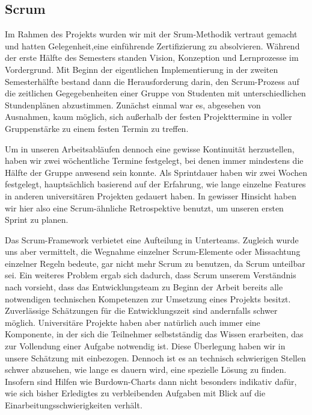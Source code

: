 \subsection{Scrum}
	Im Rahmen des Projekts wurden wir mit der Srum-Methodik vertraut gemacht und hatten Gelegenheit,eine einführende Zertifizierung zu absolvieren. Während der erste Hälfte des Semesters standen Vision, Konzeption und Lernprozesse im Vordergrund. Mit Beginn der eigentlichen Implementierung in der zweiten Semesterhälfte bestand dann die Herausforderung darin, den Scrum-Prozess auf die zeitlichen Gegegebenheiten einer Gruppe von Studenten mit unterschiedlichen Stundenplänen abzustimmen. Zunächst einmal war es, abgesehen von Ausnahmen, kaum möglich, sich außerhalb der festen Projekttermine in voller Gruppenstärke zu einem festen Termin zu treffen. 
    
	Um in unseren Arbeitsabläufen dennoch eine gewisse Kontinuität herzustellen, haben wir zwei wöchentliche Termine festgelegt, bei denen immer mindestens die Hälfte der Gruppe anwesend sein konnte. Als Sprintdauer haben wir zwei Wochen festgelegt, hauptsächlich basierend auf der Erfahrung, wie lange einzelne Features in anderen universitären Projekten gedauert haben. In gewisser Hinsicht haben wir hier also eine Scrum-ähnliche Retrospektive benutzt, um unseren ersten Sprint zu planen.
    
	Das Scrum-Framework verbietet eine Aufteilung in Unterteams. Zugleich wurde uns aber vermittelt, die Wegnahme einzelner Scrum-Elemente oder Missachtung einzelner Regeln bedeute, gar nicht mehr Scrum zu benutzen, da Scrum unteilbar sei. Ein weiteres Problem ergab sich dadurch, dass Scrum unserem Verständnis nach vorsieht, dass das Entwicklungsteam zu Beginn der Arbeit bereits alle notwendigen technischen Kompetenzen zur Umsetzung eines Projekts besitzt. Zuverlässige Schätzungen für die Entwicklungszeit sind andernfalls schwer möglich. Universitäre Projekte haben aber natürlich auch immer eine Komponente, in der sich die Teilnehmer selbstständig das Wissen erarbeiten, das zur Vollendung einer Aufgabe notwendig ist. Diese Überlegung haben wir in unsere Schätzung mit einbezogen. Dennoch ist es an technisch schwierigen Stellen schwer abzusehen, wie lange es dauern wird, eine spezielle Lösung zu finden. Insofern sind Hilfen wie Burdown-Charts dann nicht besonders indikativ dafür, wie sich bisher Erledigtes zu verbleibenden Aufgaben mit Blick auf die Einarbeitungsschwierigkeiten verhält.
	
